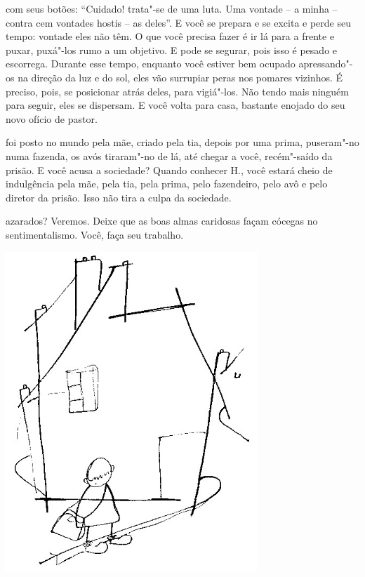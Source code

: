 \bigskip
\bigskip


\pagebreak

 com seus botões: ``Cuidado! trata"-se de uma luta. Uma vontade -- a
minha -- contra cem vontades hostis -- as deles''. E você se prepara e
se excita e perde seu tempo: vontade eles não têm. O que você precisa
fazer é ir lá para a frente e puxar, puxá"-los rumo a um objetivo. E pode
se segurar, pois isso é pesado e escorrega. Durante esse tempo, enquanto
você estiver bem ocupado apressando"-os na direção da luz e do sol, eles
vão surrupiar peras nos pomares vizinhos. É preciso, pois, se posicionar
atrás deles, para vigiá"-los. Não tendo mais ninguém para seguir, eles se
dispersam. E você volta para casa, bastante enojado do seu novo ofício
de pastor.

\bigskip
\bigskip


 foi posto no mundo pela mãe, criado pela tia, depois por uma prima,
puseram"-no numa fazenda, os avós tiraram"-no de lá, até chegar a você,
recém"-saído da prisão. E você acusa a sociedade? Quando conhecer H.,
você estará cheio de indulgência pela mãe, pela tia, pela prima, pelo
fazendeiro, pelo avô e pelo diretor da prisão. Isso não tira a culpa da
sociedade.

\bigskip
\bigskip


 azarados? Veremos. Deixe que as boas almas caridosas façam
cócegas no sentimentalismo. Você, faça seu trabalho.

\bigskip
\bigskip

\pagebreak
\thispagestyle{empty}

\begin{vplace}[.50]
\begin{center}
\includegraphics[width=95mm]{./imgs/Image_3.jpg}
\end{center}
\end{vplace}

